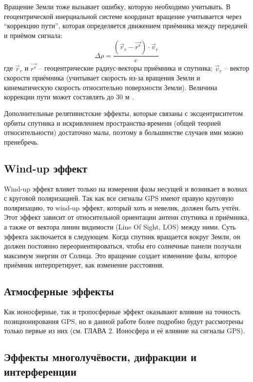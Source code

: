 Вращение Земли тоже вызывает ошибку, которую необходимо учитывать. 
В геоцентрической инерциальной системе координат вращение учитывается через ``коррекцию пути'', которая определяется движением приёмника между передачей и приёмом сигнала:
\begin{equation}
\Delta\rho=\frac{(\vec{r}_r-\vec{r^s})\cdot\vec{v}_r}{c}    
\end{equation}
где
$\vec{r}_r$ и $\vec{r^s}$ -- геоцентрические радиус-векторы приёмника и спутника;
$\vec{v}_r$ -- вектор скорости приёмника (учитывает скорость из-за вращения Земли и кинематическую скорость относительно поверхности Земли). 
Величина коррекции пути может составлять до 30 м \cite{Hecimovic2013}.  

Дополнительные релятивистские эффекты, которые связаны с эксцентриситетом орбиты спутника и искривлением пространства-времени (общей теорией относительности) достаточно малы, поэтому в большинстве случаев ими можно пренебречь. 

\subsection*{\textbf{Wind-up эффект}}

Wind-up эффект влияет только на измерения фазы несущей и возникает в волнах с круговой поляризацией.
Так как все сигналы GPS имеют правую круговую поляризацию, то wind-up эффект, который хоть и невелик, должен быть учтён. 
Этот эффект зависит от относительной ориентации антенн спутника и приёмника, а также от вектора линии видимости (Line Of Sight, LOS) между ними.
Суть эффекта заключается в следующем.
Когда спутник вращается вокруг Земли, он должен постоянно переориентироваться, чтобы его солнечные панели получали максимум энергии от Солнца.
Это вращение создает изменение фазы, которое приёмник интерпретирует, как изменение расстояния. 

\subsection*{\textbf{Атмосферные эффекты}}

Как ионосферные, так и тропосферные эффект оказывают влияние на точность позиционирования GPS, но в данной работе более подробно будут рассмотрены только первые из них (см. ГЛАВА 2. Ионосфера и её влияние на сигналы GPS). 

\subsection*{\textbf{Эффекты многолучёвости, дифракции и интерференции}}

